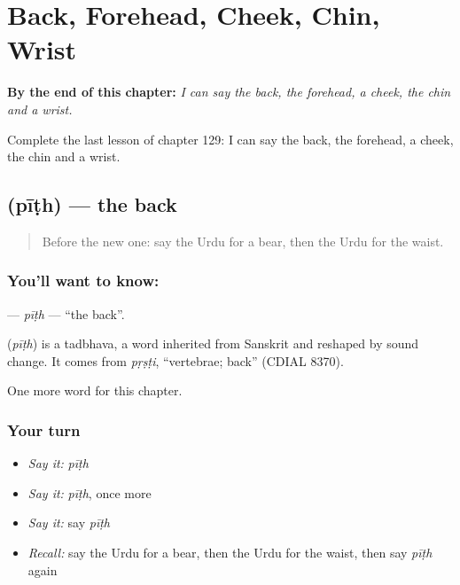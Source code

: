 
\chapter{Back, Forehead, Cheek, Chin, Wrist}
\label{ch:ur-back-forehead-cheek-chin-wrist}

\begin{chapteropening}
\textbf{By the end of this chapter:} \emph{I can say the back, the forehead, a cheek, the chin and a wrist.}

Complete the last lesson of chapter 129: I can say the back, the forehead, a cheek, the chin and a wrist.
\end{chapteropening}

\section[\texorpdfstring{\ur{پیٹھ} (pīṭh)}{پیٹھ (pīṭh)}]{ (pīṭh) — the back}

\label{lesson:UR-C129-pith}



\begin{quote}
Before the new one: say the Urdu for a bear, then the Urdu for the waist.
\end{quote}

\subsection*{You'll want to know: }
\textbf{} — \emph{pīṭh} — \textquotedblleft{}the back\textquotedblright{}.

\begin{cousinweb}
\textbf{} (\emph{pīṭh}) is a tadbhava, a word inherited from Sanskrit and reshaped by sound change. It comes from \emph{pṛṣṭi}, \textquotedblleft{}vertebrae; back\textquotedblright{} (CDIAL 8370).
\end{cousinweb}

\begin{grammarlens}[title={What you've built}]
One more word for this chapter.
\end{grammarlens}

\subsection*{Your turn}
\begin{itemize}
\raggedright
  \item \emph{Say it:} \emph{pīṭh}
  \item \emph{Say it:} \emph{pīṭh}, once more
  \item \emph{Say it:} say \emph{pīṭh}
  \item \emph{Recall:} say the Urdu for a bear, then the Urdu for the waist, then say \emph{pīṭh} again
\end{itemize}

